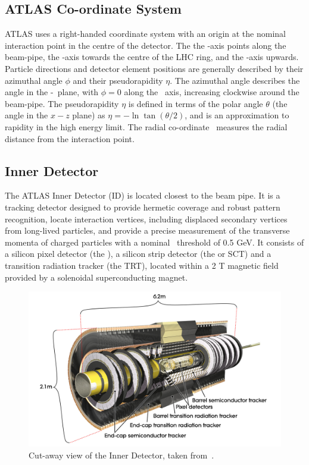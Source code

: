 \subsection{ATLAS Co-ordinate System}
ATLAS uses a right-handed coordinate system with an origin at the nominal
interaction point in the centre of the detector. The 
the \z-axis points along the beam-pipe, the \x-axis towards the 
centre of the LHC ring, and the \y-axis upwards. Particle directions and
detector element positions are generally described by their azimuthal angle
$\phi$ and their pseudorapidity $\eta$. The azimuthal angle describes the angle
in the \x-\y\ plane, with $\phi=0$ along the \x\ axis, increasing clockwise
around the beam-pipe.
The pseudorapidity $\eta$ is defined in terms of the polar angle $\theta$ (the
angle in the $x-z$ plane) as $\eta = - \ln\tan(\theta/2)$, and is an
approximation to rapidity in the high energy limit.
The radial co-ordinate \R\ measures the radial distance from the interaction
point. 

\subsection{Inner Detector}

The ATLAS Inner Detector (ID) is located closest to the beam pipe. It is a tracking
detector designed to provide hermetic coverage and robust pattern recognition, locate
interaction vertices, including displaced secondary vertices from long-lived
particles, and provide a precise measurement of the transverse momenta of charged
particles with a nominal \pt\ threshold of 0.5 GeV. It consists
of a silicon pixel detector (the ), a silicon strip
detector (the  or SCT) and a transition radiation tracker (the TRT), located within a
2 T magnetic field provided by a solenoidal superconducting magnet.

\begin{figure}[h]
\centering
\includegraphics[width=\textwidth]{ID_newTRT_d3}
\caption[Cut-away view of the Inner Detector.]{Cut-away view of the Inner Detector, taken from~\cite{Aad:1125884}.}
\label{fig:id-1}
\end{figure}

